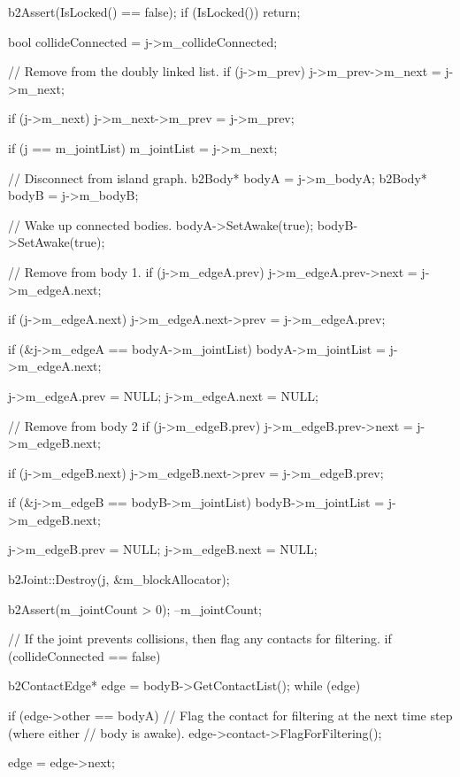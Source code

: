 \begin{DoxyCode}
{
        b2Assert(IsLocked() == false);
        if (IsLocked())
        {
                return;
        }

        bool collideConnected = j->m_collideConnected;

        // Remove from the doubly linked list.
        if (j->m_prev)
        {
                j->m_prev->m_next = j->m_next;
        }

        if (j->m_next)
        {
                j->m_next->m_prev = j->m_prev;
        }

        if (j == m_jointList)
        {
                m_jointList = j->m_next;
        }

        // Disconnect from island graph.
        b2Body* bodyA = j->m_bodyA;
        b2Body* bodyB = j->m_bodyB;

        // Wake up connected bodies.
        bodyA->SetAwake(true);
        bodyB->SetAwake(true);

        // Remove from body 1.
        if (j->m_edgeA.prev)
        {
                j->m_edgeA.prev->next = j->m_edgeA.next;
        }

        if (j->m_edgeA.next)
        {
                j->m_edgeA.next->prev = j->m_edgeA.prev;
        }

        if (&j->m_edgeA == bodyA->m_jointList)
        {
                bodyA->m_jointList = j->m_edgeA.next;
        }

        j->m_edgeA.prev = NULL;
        j->m_edgeA.next = NULL;

        // Remove from body 2
        if (j->m_edgeB.prev)
        {
                j->m_edgeB.prev->next = j->m_edgeB.next;
        }

        if (j->m_edgeB.next)
        {
                j->m_edgeB.next->prev = j->m_edgeB.prev;
        }

        if (&j->m_edgeB == bodyB->m_jointList)
        {
                bodyB->m_jointList = j->m_edgeB.next;
        }

        j->m_edgeB.prev = NULL;
        j->m_edgeB.next = NULL;

        b2Joint::Destroy(j, &m_blockAllocator);

        b2Assert(m_jointCount > 0);
        --m_jointCount;

        // If the joint prevents collisions, then flag any contacts for
       filtering.
        if (collideConnected == false)
        {
                b2ContactEdge* edge = bodyB->GetContactList();
                while (edge)
                {
                        if (edge->other == bodyA)
                        {
                                // Flag the contact for filtering at the next
       time step (where either
                                // body is awake).
                                edge->contact->FlagForFiltering();
                        }

                        edge = edge->next;
                }
        }
}
\end{DoxyCode}
